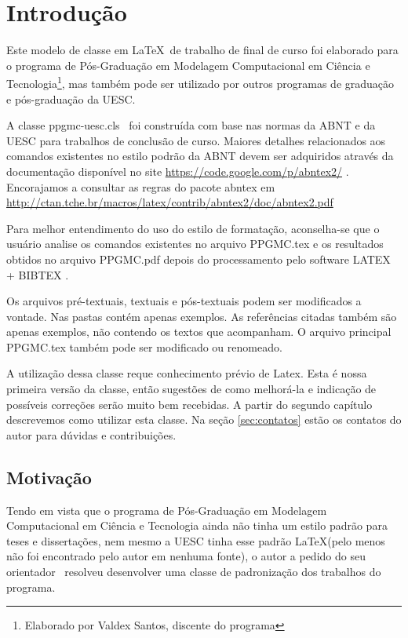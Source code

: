 %
%

\chapter{Introdução}\label{chap:introducao}
Este modelo de classe em \LaTeX \ de trabalho de final de curso foi elaborado para o programa de Pós-Graduação em Modelagem Computacional em Ciência e Tecnologia\footnote{Elaborado por Valdex Santos, discente do programa}, mas também pode ser utilizado por outros programas de graduação e pós-graduação da UESC. 

A classe {\ttfamily ppgmc-uesc.cls} \ foi construída com base nas normas da ABNT e da UESC para trabalhos de conclusão de curso. Maiores detalhes relacionados aos comandos existentes no estilo podrão da ABNT devem ser adquiridos através da documentação disponível no site \href{https://code.google.com/p/abntex2/}{https://code.google.com/p/abntex2/} \cite{abntex2classe}. Encorajamos a consultar as regras do pacote abntex em \href{http://ctan.tche.br/macros/latex/contrib/abntex2/doc/abntex2.pdf}{http://ctan.tche.br/macros/latex/contrib/abntex2/doc/abntex2.pdf}

Para melhor entendimento do uso do estilo de formatação, aconselha-se que o  usuário analise os comandos existentes no arquivo {\ttfamily PPGMC.tex} e os resultados obtidos no arquivo {\ttfamily PPGMC.pdf} depois do processamento pelo software LATEX + BIBTEX \cite{latex14,BibTeX14}.

Os arquivos pré-textuais, textuais e pós-textuais podem ser modificados a vontade. Nas pastas contém apenas exemplos. As referências citadas também são apenas exemplos, não contendo os textos que acompanham. O arquivo principal {\ttfamily PPGMC.tex} também pode ser modificado ou renomeado.

A utilização dessa classe reque conhecimento prévio de Latex. Esta é nossa primeira versão da classe, então sugestões de como melhorá-la e indicação de possíveis correções serão muito bem recebidas. A partir do segundo capítulo descrevemos como utilizar esta classe. Na seção \ref{sec:contatos} estão os contatos do autor para dúvidas e contribuições.

\section{Motivação}
\label{sec:motivacao}

Tendo em vista que o programa de Pós-Graduação em Modelagem Computacional em Ciência e Tecnologia ainda não tinha um estilo padrão para teses e dissertações, nem mesmo a UESC tinha esse padrão \LaTeX (pelo menos não foi encontrado pelo autor em nenhuma fonte), o autor a pedido do seu orientador \imprimirorientador \ resolveu desenvolver uma classe de padronização dos trabalhos do programa.

